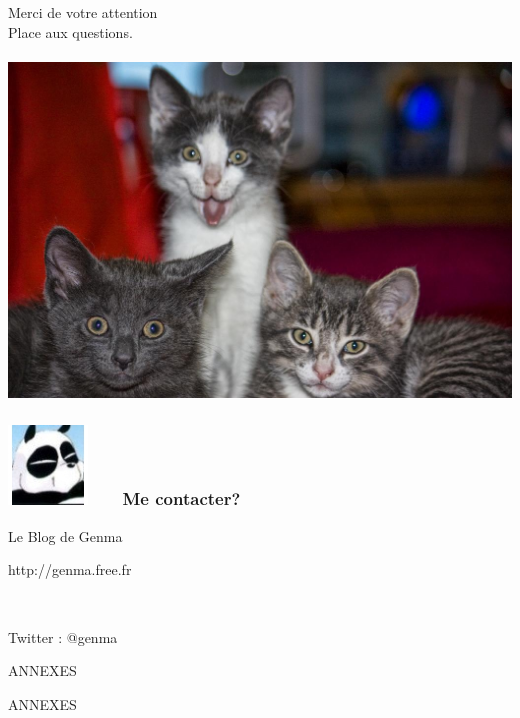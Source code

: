 \documentclass{beamer}
\begin{document}
\begin{frame}
\begin{center}
\Huge{Merci de votre attention}
\\
\Huge{Place aux questions.}
\\~\\
\includegraphics[scale=0.2] {./images/chat.jpg}
\end{center}
\end{frame}

\begin{frame}
\frametitle{\includegraphics[scale=0.4]{./images/Genma.jpg} \ \ \  Me contacter?}
\Huge{\centerline{Le Blog de Genma}}
\Huge{\centerline{http://genma.free.fr}}
\Huge{\centerline{~}}
\Huge{\centerline{Twitter : @genma}}
\end{frame}

\begin{frame}
\Huge{\centerline{ANNEXES}}
\end{frame}

\begin{frame}
\Huge{\centerline{ANNEXES}}
\end{frame}
\end{document}
